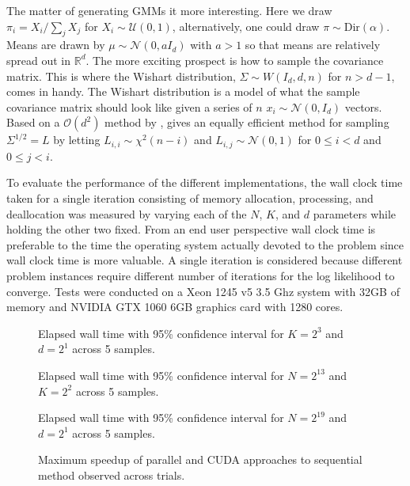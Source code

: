 \documentclass{article}
\newcommand{\boundedBy}[1]{\mathcal{O} \left ( #1 \right )}
\begin{document}
The matter of generating GMMs it more interesting. Here we draw $\pi_i = X_i / \sum_{j} X_j$ for $X_i \sim \mathcal{U}(0, 1)$, alternatively, one could draw $\pi \sim \text{Dir}(\alpha)$. Means are drawn by $\mu \sim \mathcal{N}(0, a I_d)$ with $a > 1$ so that means are relatively spread out in $\mathbb{R}^{d}$. The more exciting prospect is how to sample the covariance matrix. This is where the Wishart distribution, $\Sigma \sim W(I_d, d, n)$ for $n > d - 1$, comes in handy. The Wishart distribution is a model of what the sample covariance matrix should look like given a series of $n$ $x_i \sim \mathcal{N}(0, I_d)$ vectors. Based on a $\boundedBy{d^2}$ method by \cite{odell1966numerical}, \cite{sawyer2007wishart} gives an equally efficient method for sampling $\Sigma^{1/2} = L$ by letting $L_{i,i} \sim \chi^2(n - i)$ and $L_{i,j} \sim \mathcal{N}(0, 1)$ for $0 \le i < d$ and $0 \le j < i$. 

To evaluate the performance of the different implementations, the wall clock time taken for a single iteration consisting of memory allocation, processing, and deallocation was measured by varying each of the $N$, $K$, and $d$ parameters while holding the other two fixed. From an end user perspective wall clock time is preferable to the time the operating system actually devoted to the problem since wall clock time is more valuable. A single iteration is considered because different problem instances require different number of iterations for the log likelihood to converge. Tests were conducted on a Xeon 1245 v5 3.5 Ghz system with 32GB of memory and NVIDIA GTX 1060 6GB graphics card with 1280 cores.
\newpage

\begin{multicols}{2}
\begin{figure}[H]
	\centering
	\resizebox{\linewidth}{!}{}
	\caption{Elapsed wall time with 95\% confidence interval for $K = 2^{3}$ and $d = 2^{1}$ across 5 samples.}
	\label{fig:timeNumPoints}
\end{figure}

\begin{figure}[H]
	\centering
	\resizebox{\linewidth}{!}{}
	\caption{Elapsed wall time with 95\% confidence interval for $N = 2^{13}$ and $K = 2^{2}$ across 5 samples.}
	\label{fig:timePointDim}
\end{figure}

\columnbreak

\begin{figure}[H]
	\centering
	\resizebox{\linewidth}{!}{}
	\caption{Elapsed wall time with 95\% confidence interval for $N = 2^{19} $ and $d = 2^{1}$ across 5 samples.}
	\label{fig:timeNumComponents}
\end{figure}

\begin{figure}[H]
	\centering
	\caption{Maximum speedup of parallel and CUDA approaches to sequential method observed across trials.}
	\label{fig:sppedup}
\end{figure}
\end{multicols}
\end{document}

